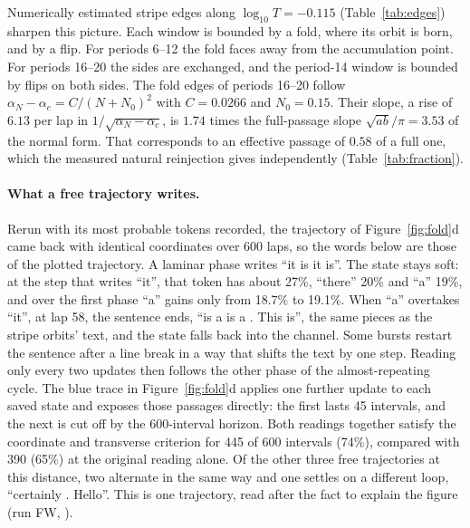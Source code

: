 \documentclass[11pt,letterpaper]{article}
\begin{document}
Numerically estimated stripe edges along $\log_{10}T=-0.115$ (Table~\ref{tab:edges}) sharpen this picture. Each
window is bounded by a fold, where its orbit is born, and by a flip. For periods 6--12 the fold faces away from the
accumulation point. For periods 16--20 the sides are exchanged, and the period-14 window is bounded by flips on both
sides. The fold edges of periods 16--20 follow $\alpha_N-\alpha_c=C/(N+N_0)^2$ with $C=0.0266$ and $N_0=0.15$.
Their slope, a rise of $6.13$ per lap in $1/\sqrt{\alpha_N-\alpha_c}$, is $1.74$ times the full-passage slope
$\sqrt{ab}/\pi=3.53$ of the normal form. That corresponds to an effective passage of $0.58$ of a full one, which the
measured natural reinjection gives independently (Table~\ref{tab:fraction}).
\paragraph{What a free trajectory writes.} Rerun with its most probable tokens recorded, the trajectory of
Figure~\ref{fig:fold}d came back with identical coordinates over 600 laps, so the words below are those of the plotted
trajectory. A laminar phase writes ``it is it is''. The state stays soft: at the step that writes ``it'', that token has
about 27\%, ``there'' 20\% and ``a'' 19\%, and over the first phase ``a'' gains only from 18.7\% to 19.1\%. When ``a''
overtakes ``it'', at lap 58, the sentence ends, ``is a is a . This is'', the same pieces as the stripe orbits' text, and the
state falls back into the channel. Some bursts restart the sentence after a line break in a way that shifts the text by one
step. Reading only every two updates then follows the other phase of the almost-repeating cycle.
The blue trace in Figure~\ref{fig:fold}d applies one further update to each saved state and exposes those
passages directly: the first lasts 45 intervals, and the next is cut off by the 600-interval horizon.
Both readings together satisfy the coordinate and transverse criterion for 445 of 600 intervals (74\%),
compared with 390 (65\%) at the original reading alone. Of the other three free trajectories at this distance, two alternate in the same
way and one settles on a different loop, ``certainly . Hello''. This is one trajectory, read after the fact to explain the
figure (run FW, ).
\end{document}
